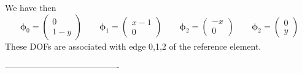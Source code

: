 We have then
\[
{\bm \phi}_0 = \left( \begin{array}{c} 0 \\ 1-y  \end{array} \right)
\qquad
{\bm \phi}_1 = \left( \begin{array}{c} x-1 \\0  \end{array} \right)
\qquad
{\bm \phi}_2 = \left( \begin{array}{c} -x \\ 0  \end{array} \right)
\qquad
{\bm \phi}_2 = \left( \begin{array}{c} 0 \\y  \end{array} \right)
\]
These DOFs are associated with edge 0,1,2 of the reference element.

----------------------------------------




